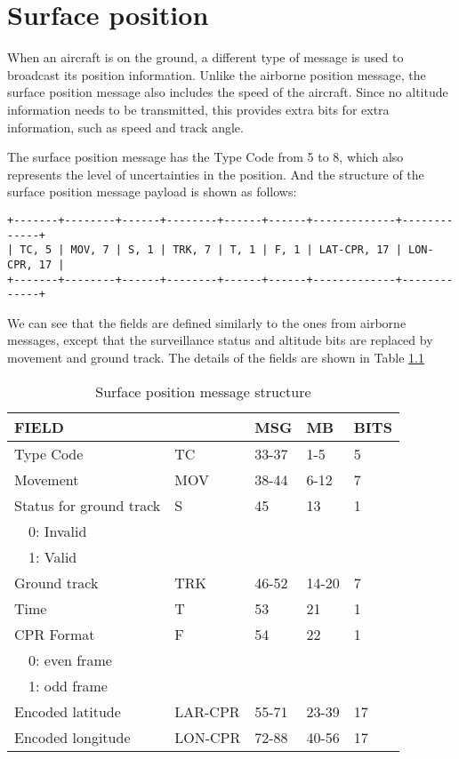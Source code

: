 \chapter{Surface position}

When an aircraft is on the ground, a different type of message is used to broadcast its position information. Unlike the airborne position message, the surface position message also includes the speed of the aircraft. Since no altitude information needs to be transmitted, this provides extra bits for extra information, such as speed and track angle.

The surface position message has the Type Code from 5 to 8, which also represents the level of uncertainties in the position. And the structure of the surface position message payload is shown as follows:


\begin{verbatim}
+-------+--------+------+--------+------+------+-------------+-------------+
| TC, 5 | MOV, 7 | S, 1 | TRK, 7 | T, 1 | F, 1 | LAT-CPR, 17 | LON-CPR, 17 |
+-------+--------+------+--------+------+------+-------------+-------------+
\end{verbatim}

We can see that the fields are defined similarly to the ones from airborne messages, except that the surveillance status and altitude bits are replaced by movement and ground track. The details of the fields are shown in Table \ref{tb:adsb-surf-pos-fields}

\begin{table}[ht]
\caption{Surface position message structure}
\label{tb:adsb-surf-pos-fields}
\begin{tabular}{|l|l|l|l|l|}
\hline
\textbf{FIELD} & \textbf{} & \textbf{MSG} & \textbf{MB} & \textbf{BITS} \\ \hline
Type Code & TC & 33-37 & 1-5 & 5 \\ \hline
Movement & MOV & 38-44 & 6-12 & 7 \\ \hline
Status for ground track & S & 45 & 13 & 1\\
~~0: Invalid & & & &\\
~~1: Valid & & & &\\ \hline
Ground track & TRK & 46-52 & 14-20 & 7 \\ \hline
Time & T & 53 & 21 & 1 \\ \hline
CPR Format  & F & 54 & 22 & 1\\
~~0: even frame & & & &\\
~~1: odd frame & & & &\\ \hline
Encoded latitude & LAR-CPR & 55-71 & 23-39 & 17 \\ \hline
Encoded longitude & LON-CPR & 72-88 & 40-56 & 17 \\ \hline
\end{tabular}
\end{table}

